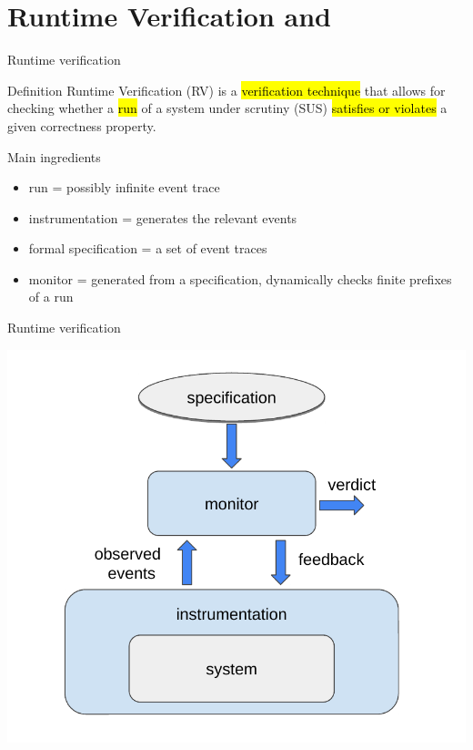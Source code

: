 \documentclass[10pt,usenames,dvipsnames]{beamer}
\begin{document}
\section{Runtime Verification and \rml}

\begin{frame}{Runtime verification}

  \begin{block}{Definition}
    Runtime Verification (RV) is a \hl{verification technique} that allows for checking whether a \hl{run} of a system under scrutiny (SUS) \hl{satisfies or violates} a given correctness property.
  \end{block}

  \begin{block}{Main ingredients}
   \begin{itemize}
   \item run = possibly infinite event trace
   \item instrumentation = generates the relevant events
   \item formal specification = a set of event traces     
   \item monitor =  generated from a specification, dynamically checks finite prefixes of a run 
\end{itemize}
  \end{block}

\end{frame}


\begin{frame}{Runtime verification}

  \begin{center}
    \includegraphics[keepaspectratio,height=0.7\textheight]{images/rv}
  \end{center}

\end{frame}
\end{document}
